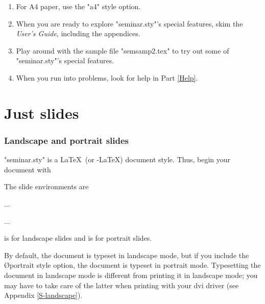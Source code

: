 \begin{enumerate}
\item For A4 paper, use the "a4" style option.

\item When you are ready to explore "seminar.sty"'s special features, skim the
{\em User's Guide}, including the appendices.

\item Play around with the sample file "semsamp2.tex" to try out some of
"seminar.sty"'s special features.

\item When you run into problems, look for help in Part \ref{Help}.

\end{enumerate}

\twosideclearpage


\part{Just slides}

\section{Landscape and portrait slides}

"seminar.sty" is a \LaTeX\ (or \AmS-\LaTeX) document style. Thus, begin your
document with
\begin{LVerbatim}
\end{LVerbatim}

The slide environments are%
\begin{LVerbatim}
  \begin{slide}    ...    \end{slide}
  \begin{slide*}   ...    \end{slide*}
\end{LVerbatim}
 is for landscape slides and  is for portrait slides.

By default, the document is typeset in landscape mode, but if you include the
\O{portrait} style option, the document is typeset in portrait mode.
Typesetting the document in landscape mode is different from printing it in
landscape mode; you may have to take care of the latter when printing with
your dvi driver (see Appendix \ref{S-landscape}).

